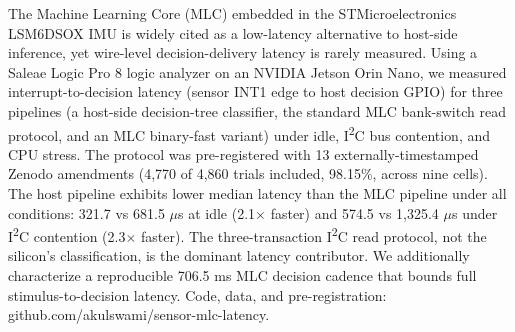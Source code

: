 The Machine Learning Core (MLC) embedded in the STMicroelectronics LSM6DSOX IMU is widely cited as a low-latency alternative to host-side inference, yet wire-level decision-delivery latency is rarely measured. Using a Saleae Logic Pro 8 logic analyzer on an NVIDIA Jetson Orin Nano, we measured interrupt-to-decision latency (sensor INT1 edge to host decision GPIO) for three pipelines (a host-side decision-tree classifier, the standard MLC bank-switch read protocol, and an MLC binary-fast variant) under idle, I\textsuperscript{2}C bus contention, and CPU stress. The protocol was pre-registered with 13 externally-timestamped Zenodo amendments (4,770 of 4,860 trials included, 98.15\%, across nine cells). The host pipeline exhibits lower median latency than the MLC pipeline under all conditions: 321.7 vs 681.5 $\mu$s at idle (2.1$\times$ faster) and 574.5 vs 1,325.4 $\mu$s under I\textsuperscript{2}C contention (2.3$\times$ faster). The three-transaction I\textsuperscript{2}C read protocol, not the silicon's classification, is the dominant latency contributor. We additionally characterize a reproducible 706.5 ms MLC decision cadence that bounds full stimulus-to-decision latency. Code, data, and pre-registration: github.com/akulswami/sensor-mlc-latency.